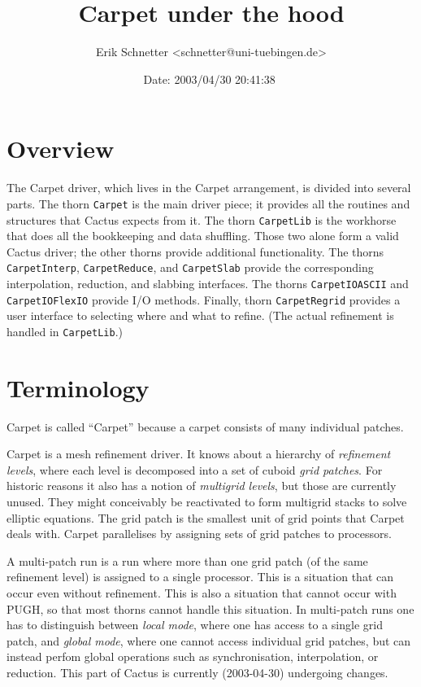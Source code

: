 \documentclass{article}
\begin{document}
\title{Carpet under the hood}
\author{Erik Schnetter \textless schnetter@uni-tuebingen.de\textgreater}
\date{$ $Date: 2003/04/30 20:41:38 $ $}
\maketitle

\tableofcontents

\section{Overview}

   The Carpet driver, which lives in the Carpet arrangement, is
   divided into several parts.  The thorn \texttt{Carpet} is the main
   driver piece; it provides all the routines and structures that
   Cactus expects from it.  The thorn \texttt{CarpetLib} is the
   workhorse that does all the bookkeeping and data shuffling.  Those
   two alone form a valid Cactus driver; the other thorns provide
   additional functionality.  The thorns \texttt{CarpetInterp},
   \texttt{CarpetReduce}, and \texttt{CarpetSlab} provide the
   corresponding interpolation, reduction, and slabbing interfaces.
   The thorns \texttt{CarpetIOASCII} and \texttt{CarpetIOFlexIO}
   provide I/O methods.  Finally, thorn \texttt{CarpetRegrid} provides
   a user interface to selecting where and what to refine.  (The
   actual refinement is handled in \texttt{CarpetLib}.)



\section{Terminology}

   Carpet is called ``Carpet'' because a carpet consists of many
   individual patches.

   Carpet is a mesh refinement driver.  It knows about a hierarchy of
   \emph{refinement levels}, where each level is decomposed into a set
   of cuboid \emph{grid patches}.  For historic reasons it also has a
   notion of \emph{multigrid levels}, but those are currently unused.
   They might conceivably be reactivated to form multigrid stacks to
   solve elliptic equations.  The grid patch is the smallest unit of
   grid points that Carpet deals with.  Carpet parallelises by
   assigning sets of grid patches to processors.

   A multi-patch run is a run where more than one grid patch (of the
   same refinement level) is assigned to a single processor.  This is
   a situation that can occur even without refinement.  This is also a
   situation that cannot occur with PUGH, so that most thorns cannot
   handle this situation.  In multi-patch runs one has to distinguish
   between \emph{local mode}, where one has access to a single grid
   patch, and \emph{global mode}, where one cannot access individual
   grid patches, but can instead perfom global operations such as
   synchronisation, interpolation, or reduction.  This part of Cactus
   is currently (2003-04-30) undergoing changes.
\end{document}

